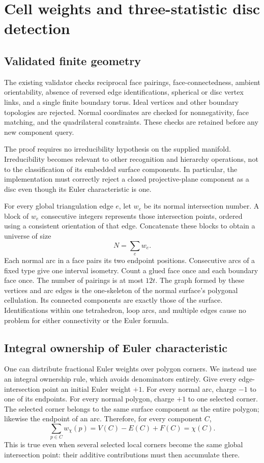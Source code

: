 \section{Cell weights and three-statistic disc detection}\label{sec:geometry}

\subsection{Validated finite geometry}

The existing validator checks reciprocal face pairings, face-connectedness,
ambient orientability, absence of reversed edge identifications, spherical
or disc vertex links, and a single finite boundary torus. Ideal vertices and
other boundary topologies are rejected. Normal coordinates are checked for
nonnegativity, face matching, and the quadrilateral constraints. These checks
are retained before any new component query.

The proof requires no irreducibility hypothesis on the supplied manifold.
Irreducibility becomes relevant to other recognition and hierarchy operations,
not to the classification of its embedded surface components. In particular,
the implementation must correctly reject a closed projective-plane component
as a disc even though its Euler characteristic is one.

For every global triangulation edge $e$, let $w_e$ be its normal intersection
number. A block of $w_e$ consecutive integers represents those intersection
points, ordered using a consistent orientation of that edge. Concatenate
these blocks to obtain a universe of size
\[
                        N=\sum_e w_e.
\]
Each normal arc in a face pairs its two endpoint positions. Consecutive arcs
of a fixed type give one interval isometry. Count a glued face once and each
boundary face once. The number of pairings is at most $12t$. The graph formed
by these vertices and arc edges is the one-skeleton of the normal surface's
polygonal cellulation. Its connected components are exactly those of the
surface. Identifications within one tetrahedron, loop arcs, and multiple
edges cause no problem for either connectivity or the Euler formula.

\subsection{Integral ownership of Euler characteristic}

One can distribute fractional Euler weights over polygon corners. We instead
use an integral ownership rule, which avoids denominators entirely.
Give every edge-intersection point an initial Euler weight $+1$. For every
normal arc, charge $-1$ to one of its endpoints. For every normal polygon,
charge $+1$ to one selected corner. The selected corner belongs to the same
surface component as the entire polygon; likewise the endpoint of an arc.
Therefore, for every component $C$,
\[
             \sum_{p\in C} w_\chi(p)=V(C)-E(C)+F(C)=\chi(C).
\]
This is true even when several selected local corners become the same global
intersection point: their additive contributions must then accumulate there.

